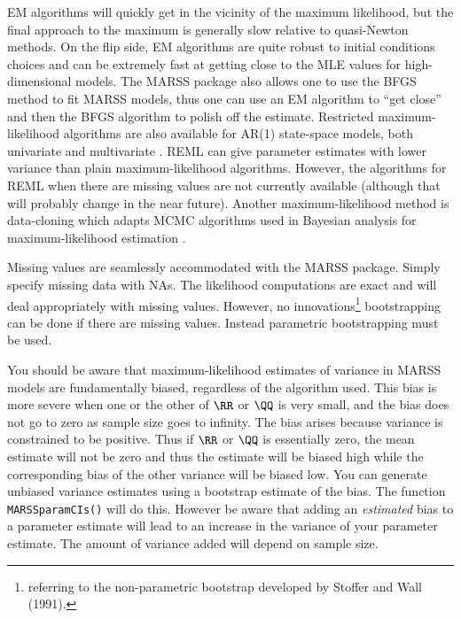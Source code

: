 EM algorithms will quickly get in the vicinity of the maximum likelihood, but the final approach to the maximum is generally slow relative to quasi-Newton methods.  On the flip side, EM algorithms are quite robust to initial conditions choices and can be extremely fast at getting close to the MLE values for high-dimensional models.  The MARSS package also allows one to use the BFGS method to fit MARSS models, thus one can use an EM algorithm to ``get close'' and then the BFGS algorithm to polish off the estimate. Restricted maximum-likelihood algorithms are also available for AR(1) state-space models, both univariate \citep{Staplesetal2004} and multivariate \citep{HinrichsenHolmes2009}.  REML can give parameter estimates with lower variance than plain maximum-likelihood algorithms.  However, the algorithms for REML when there are missing values are not currently available (although that will probably change in the near future).  Another maximum-likelihood method is data-cloning which adapts MCMC algorithms used in Bayesian analysis for maximum-likelihood estimation \citep{Leleetal2007}.  

Missing values are seamlessly accommodated with the MARSS package.  Simply specify missing data with NAs.  The likelihood computations are exact and will deal appropriately with missing values.  However, no innovations\footnote{referring to the non-parametric bootstrap developed by Stoffer and Wall (1991).} bootstrapping can be done if there are missing values.  Instead parametric bootstrapping must be used.

You should be aware that maximum-likelihood estimates of variance in MARSS models are fundamentally biased, regardless of the algorithm used.  This bias is more severe when one or the other of $\RR$ or $\QQ$ is very small, and the bias does not go to zero as sample size goes to infinity.  The bias arises because variance is constrained to be positive.  Thus if $\RR$ or $\QQ$ is essentially zero, the mean estimate will not be zero and thus the estimate  will be biased high while the corresponding bias of the other variance will be biased low.  You can generate unbiased variance estimates using a bootstrap estimate of the bias.  The function \texttt{MARSSparamCIs()} will do this.  However be aware that adding an {\it estimated} bias to a parameter estimate will lead to an increase in the variance of your parameter estimate.  The amount of variance added will depend on sample size.

